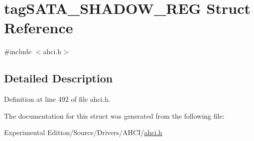 \hypertarget{structtagSATA__SHADOW__REG}{}\section{tag\+S\+A\+T\+A\+\_\+\+S\+H\+A\+D\+O\+W\+\_\+\+R\+EG Struct Reference}
\label{structtagSATA__SHADOW__REG}


{\ttfamily \#include $<$ahci.\+h$>$}



\subsection{Detailed Description}


Definition at line 492 of file ahci.\+h.



The documentation for this struct was generated from the following file\+:\begin{DoxyCompactItemize}
\item 
Experimental Edition/\+Source/\+Drivers/\+A\+H\+C\+I/\hyperlink{ahci_8h}{ahci.\+h}\end{DoxyCompactItemize}
